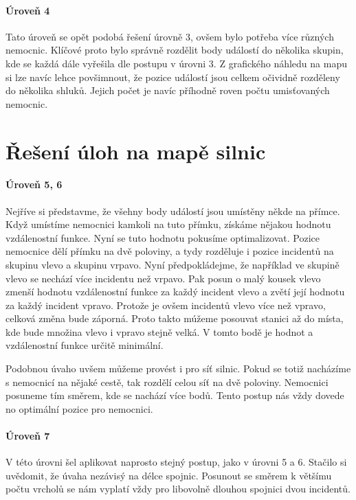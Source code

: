 \documentclass[12pt,a4paper]{article}
\begin{document}
\paragraph*{Úroveň 4}
Tato úroveň se opět podobá řešení úrovně 3, ovšem bylo potřeba více různých nemocnic. Klíčové proto bylo správně rozdělit body událostí do několika skupin, kde se každá dále vyřešila dle postupu v úrovni 3.
Z grafického náhledu na mapu si lze navíc lehce povšimnout, že pozice událostí jsou celkem očividně rozděleny do několika shluků. Jejich počet je navíc příhodně roven počtu umisťovaných nemocnic.

\section*{Řešení úloh na mapě silnic}
\paragraph*{Úroveň 5, 6}
Nejříve si představme, že všehny body událostí jsou umístěny někde na přímce. Když umístíme nemocnici kamkoli na tuto přímku, získáme nějakou hodnotu vzdálenostní funkce.
Nyní se tuto hodnotu pokusíme optimalizovat. Pozice nemocnice dělí přímku na dvě poloviny, a tydy rozděluje i pozice incidentů na skupinu vlevo a skupinu vrpavo.
Nyní předpokládejme, že například ve skupině vlevo se nechází více incidentu než vrpavo. Pak posun o malý kousek vlevo zmenší hodnotu vzdálenostní funkce za každý incident vlevo a zvětí její hodnotu za každý incident vpravo.
Protože je ovšem incidentů vlevo více než vpravo, celková změna bude záporná. Proto takto múžeme posouvat stanici až do místa, kde bude množina vlevo i vpravo stejně velká.
V tomto bodě je hodnot a vzdálenostní funkce určitě minimální.

Podobnou úvaho uvšem můžeme provést i pro síť silnic. Pokud se totiž nacházíme s nemocnicí na nějaké cestě, tak rozdělí celou síť na dvě poloviny. Nemocnici posuneme tím směrem, kde se nachází více bodů.
Tento postup nás vždy dovede no optimální pozice pro nemocnici.

\paragraph*{Úroveň 7}
V této úrovni šel aplikovat naprosto stejný postup, jako v úrovni 5 a 6. Stačilo si uvědomit, že úvaha nezávisý na délce spojnic. Posunout se směrem k většímu počtu vrcholů se nám vyplatí vždy pro libovolně dlouhou spojnici dvou incidentů.
\end{document}
